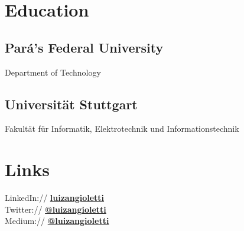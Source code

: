 \documentclass[a4paper]{deedy-resume} %
\begin{document}
\begin{minipage}[t]{0.33\textwidth} %


\section{Education} 

\subsection{Pará's Federal University}

Department of Technology \\

\sectionspace %
\subsection{Universität Stuttgart}
Fakultät für Informatik, Elektrotechnik und Informationstechnik \\
\sectionspace %




\section{Links} 

LinkedIn:// \href{https://www.linkedin.com/in/luizangioletti/?locale=en_US}{\bf luizangioletti} \\
Twitter:// \href{https://twitter.com/luizangioletti}{\bf @luizangioletti} \\
Medium:// \href{https://medium.com/@luizangioletti}{\bf @luizangioletti}\\

\sectionspace %


\end{minipage}
\end{document}
